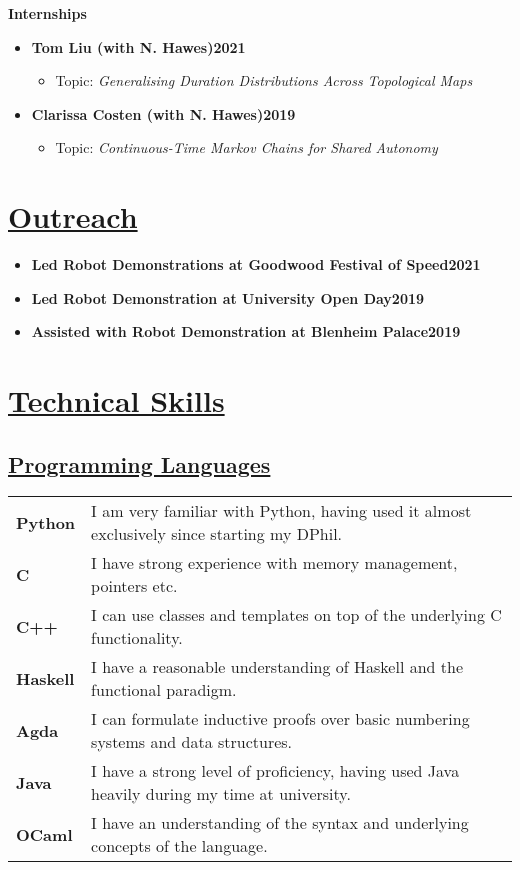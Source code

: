 \documentclass[11pt]{article}
\begin{document}
\noindent \textbf{Internships}	
\begin{itemize}
\item \textbf{Tom Liu (with N. Hawes)\hfill 2021}
\begin{itemize}
\item Topic: \emph{Generalising Duration Distributions Across Topological Maps}
\end{itemize}
\item \textbf{Clarissa Costen (with N. Hawes)\hfill 2019}
\begin{itemize}
\item Topic: \emph{Continuous-Time Markov Chains for Shared Autonomy}
\end{itemize}
\end{itemize}

\section*{\underline{Outreach}}
\begin{itemize}
\item \textbf{Led Robot Demonstrations at Goodwood Festival of Speed\hfill 2021}
\item \textbf{Led Robot Demonstration at University Open Day\hfill 2019}
\item \textbf{Assisted with Robot Demonstration at Blenheim Palace\hfill 2019}
\end{itemize}


\iffalse
	\section*{\underline{Technical Skills}}
		\subsection*{\underline{Programming Languages}}
		\renewcommand{\arraystretch}{1.3}%
		\begin{tabular}[20pt]{ll}
		        \textbf{Python} & I am very familiar with Python, having used it almost exclusively since starting my DPhil. \\
			\textbf{C} & I have strong experience with memory management, pointers etc. \\
			\textbf{C++} & I can use classes and templates on top of the underlying C functionality. \\
			\textbf{Haskell} & I have a reasonable understanding of Haskell and the functional paradigm.\\
			\textbf{Agda} & I can formulate inductive proofs over basic numbering systems and data structures.\\
			 \textbf{Java} &  I have a strong level of proficiency, having used Java heavily during my time at university.\\
			 \textbf{OCaml} & I have an understanding of the syntax and underlying concepts of the language.\\
		\end{tabular} 
\end{document}
